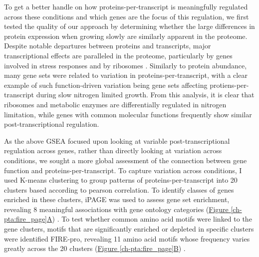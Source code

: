 To get a better handle on how proteins-per-transcript is meaningfully regulated across these conditions and which genes are the focus of this regulation, we first tested the quality of our approach by determining whether the large differences in protein expression when growing slowly are similarly apparent in the proteome. Despite notable departures between proteins and transcripts, major transcriptional effects are paralleled in the proteome, particularly by genes involved in stress responses and by ribosomes \cite{Brauer:2008jn}. Similarly to protein abundance, many gene sets were related to variation in proteins-per-transcript, with a clear example of such function-driven variation being gene sets affecting protiens-per-transcript during slow nitrogen limited growth. From this analysis, it is clear that ribosomes and metabolic enzymes are differentially regulated in nitrogen limitation, while genes with common molecular functions frequently show similar post-transcriptional regulation.

As the above GSEA focused upon looking at variable post-transcriptional regulation across genes, rather than directly looking at variation across conditions, we sought a more global assessment of the connection between gene function and proteins-per-transcript. To capture variation across conditions, I used K-means clustering to group patterns of proteins-per-transcript into 20 clusters based according to pearson correlation.  To identify classes of genes enriched in these clusters, iPAGE was used to assess gene set enrichment, revealing 8 meaningful associations with gene ontology categories (\hyperref[ch-pta:fire_page]{Figure \ref{ch-pta:fire_page}A}) \cite{Goodarzi:2009cf}. To test whether common amino acid motifs were linked to the gene clusters, motifs that are significantly enriched or depleted in specific clusters were identified FIRE-pro, revealing 11 amino acid motifs whose frequency varies greatly across the 20 clusters (\hyperref[ch-pta:fire_page]{Figure \ref{ch-pta:fire_page}B}) \cite{Lieber:2010fr}.


